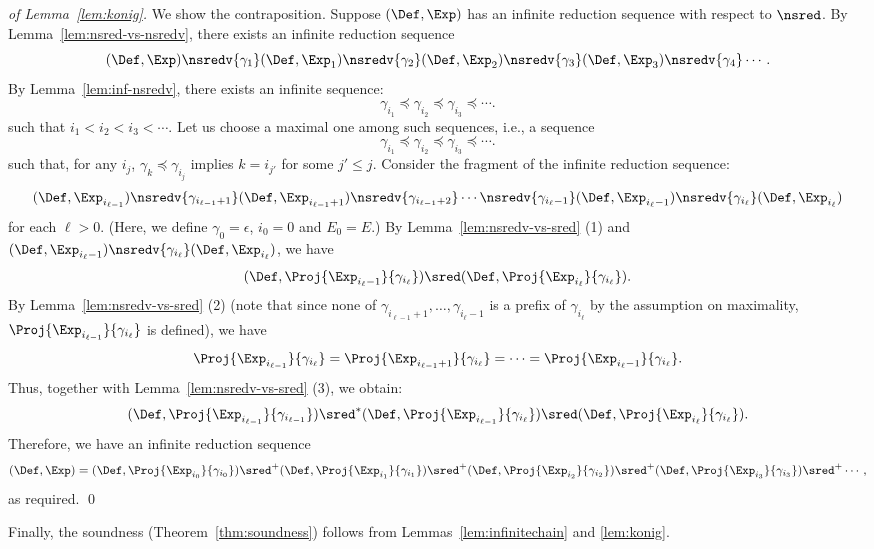 \begin{proof}[of Lemma~\ref{lem:konig}]
  We show the contraposition.
  Suppose \((\Def,\Exp)\) has an infinite reduction sequence with respect to \(\nsred\).
  By Lemma~\ref{lem:nsred-vs-nsredv}, there exists an infinite reduction sequence
  \[(\Def,\Exp)\nsredv{\gamma_1} (\Def,\Exp_1)\nsredv{\gamma_2}
(\Def,\Exp_2)\nsredv{\gamma_3}(\Def,\Exp_3)\nsredv{\gamma_4}\cdots.\]
  By Lemma~\ref{lem:inf-nsredv},
 there exists an infinite sequence:
  \[\gamma_{i_1}\preceq \gamma_{i_2}\preceq \gamma_{i_3}\preceq \cdots.\]
  such that \(i_1<i_2<i_3<\cdots\).
  Let us choose a maximal one among such sequences, i.e.,
  a sequence
  \[\gamma_{i_1}\preceq \gamma_{i_2}\preceq \gamma_{i_3}\preceq \cdots.\]
  such that, for any \(i_j\), 
  \(\gamma_{k}\preceq \gamma_{i_{j}}\) implies \(k=i_{j'}\) for some \(j'\le j\).
  Consider the fragment of the infinite reduction sequence:
  \[
  (\Def,\Exp_{i_{\ell-1}})\nsredv{\gamma_{i_{\ell-1}+1}} (\Def,\Exp_{i_{\ell-1}+1})
  \nsredv{\gamma_{i_{\ell-1}+2}}\cdots
  \nsredv{\gamma_{i_{\ell}-1}}
(\Def,\Exp_{i_{\ell}-1})\nsredv{\gamma_{i_\ell}}(\Def,\Exp_{i_\ell})
  \]
  for each \(\ell>0\). 
  (Here, we define \(\gamma_0 = \epsilon\), \(i_0=0\) and \(E_0 = E\).)
  By Lemma~\ref{lem:nsredv-vs-sred} (1)
  and \((\Def,\Exp_{i_{\ell}-1})\nsredv{\gamma_{i_\ell}}(\Def,\Exp_{i_\ell})\),
  we have
  \[(\Def,\Proj{\Exp_{i_{\ell}-1}}{\gamma_{i_\ell}})\sred
  (\Def,\Proj{\Exp_{i_{\ell}}}{\gamma_{i_\ell}}).\]
  By Lemma~\ref{lem:nsredv-vs-sred} (2) (note that
  since none of \(\gamma_{i_{\ell-1}+1},\ldots,\gamma_{i_{\ell}-1}\) is a
  prefix of \(\gamma_{i_{\ell}}\) by the assumption on maximality,
  \(\Proj{\Exp_{i_{\ell-1}}}{\gamma_{i_\ell}}\) is defined),
  we have
  \[\Proj{\Exp_{i_{\ell-1}}}{\gamma_{i_\ell}} =
  \Proj{\Exp_{i_{\ell-1}+1}}{\gamma_{i_\ell}} = \cdots =
  \Proj{\Exp_{i_{\ell}-1}}{\gamma_{i_\ell}}.\]
  Thus, together with Lemma~\ref{lem:nsredv-vs-sred} (3), we obtain:
  \[(\Def,\Proj{\Exp_{i_{\ell-1}}}{\gamma_{i_{\ell-1}}})\sred^*
  (\Def,\Proj{\Exp_{i_{\ell-1}}}{\gamma_{i_{\ell}}})\sred
  (\Def,\Proj{\Exp_{i_{\ell}}}{\gamma_{i_\ell}}).\]
  Therefore,
  we have an infinite reduction sequence
  \[(\Def,\Exp)=(\Def,\Proj{\Exp_{i_0}}{\gamma_{i_0}})\sred^+ (\Def,\Proj{\Exp_{i_1}}{\gamma_{i_1}})
  \sred^+ (\Def,\Proj{\Exp_{i_2}}{\gamma_{i_2}})
  \sred^+ (\Def,\Proj{\Exp_{i_3}}{\gamma_{i_3}})
  \sred^+ \cdots,\]
  as required. \qed
\end{proof}




    
    



Finally, the soundness (Theorem~\ref{thm:soundness}) follows from Lemmas~\ref{lem:infinitechain} and \ref{lem:konig}.
